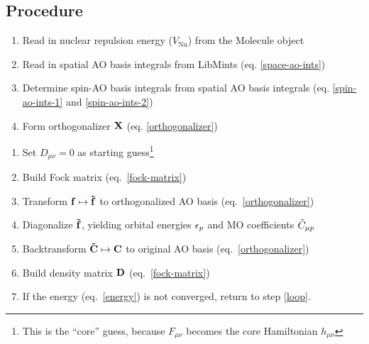 \documentclass[fleqn]{article}
\begin{document}
\subsection*{Procedure}

\begin{enumerate}
  \item Read in nuclear repulsion energy ($V_\mathrm{Nu}$) from the Molecule object
  \item Read in spatial AO basis integrals from LibMints (eq. \ref{space-ao-ints})
  \item Determine spin-AO basis integrals from spatial AO basis integrals (eq. \ref{spin-ao-ints-1} and \ref{spin-ao-ints-2})
  \item Form orthogonalizer $\mathbf{X}$ (eq. \ref{orthogonalizer})
\end{enumerate}

\noindent
{}
\begin{enumerate}
  \item Set $D_{\mu\nu}=0$ as starting guess\footnote{This is the ``core'' guess, because $F_{\mu\nu}$ becomes the core Hamiltonian $h_{\mu\nu}$}
  \item\label{loop} Build Fock matrix (eq.~\ref{fock-matrix})
  \item Transform $\mathbf{f}\mapsto\mathbf{\tilde{f}}$ to orthogonalized AO basis (eq.~\ref{orthogonalizer})
  \item Diagonalize $\mathbf{\tilde{f}}$, yielding orbital energies $\epsilon_p$ and MO coefficients $\tilde{C}_{\mu p}$
  \item Backtransform $\mathbf{\tilde{C}}\mapsto\mathbf{C}$ to original AO basis (eq.~\ref{orthogonalizer})
  \item Build density matrix $\mathbf{D}$ (eq.~\ref{fock-matrix})
  \item If the energy (eq.~\ref{energy}) is not converged, return to step \ref{loop}.
\end{enumerate}
\end{document}
